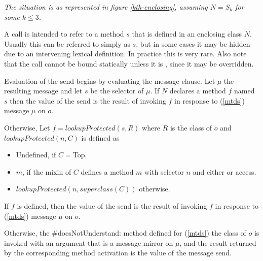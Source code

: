 \documentclass{article}
\newcommand{\code}[1]{{\sf #1}}
\begin{document}

{\it
The situation is as represented in figure \ref{kth-enclosing},  assuming $N = S_k$ for some $k \le 3$.

A call  is intended to refer to a method $s$ that is defined in an enclosing class $N$. Usually this can be referred to simply as $s$, but in some cases it may be hidden due to an intervening lexical definition.  In practice this is very rare. Also note that the call cannot be bound statically unless it is \PRIVATE{}, since it may be overridden.
}

Evaluation of the send begins by evaluating  the message clause. Let $\mu$  the resulting message and let $s$ be the selector of $\mu$.
If $N$ declares a \PRIVATE{ } method $f$ named $s$ then the value of the send is the result of invoking $f$  in response to (\ref{mtds})  message $\mu$ on  $o$. 

Otherwise, Let $f = lookupProtected(s, R)$ where $R$ is the class of $o$ and $lookupProtected(n, C)$ is defined as
\begin{itemize}
\item Undefined, if $C =$\code{Top}.
\item $m$, if the mixin of $C$ defines a method $m$ with selector $n$ and either \PUBLIC{} or \PROTECTED{}  access.
\item $lookupProtected(n, superclass(C))$ otherwise.
\end{itemize}

If $f$ is defined, then the value of the send is the result of invoking $f$ in response to (\ref{mtds}) message $\mu$ on $o$. 


Otherwise, the \code{\#doesNotUnderstand:} method  defined for (\ref{mtds}) the class of $o$ is invoked
with an argument that is a message mirror on $\mu$, and the result  returned by the corresponding method activation is the value of the message send.
\end{document}
